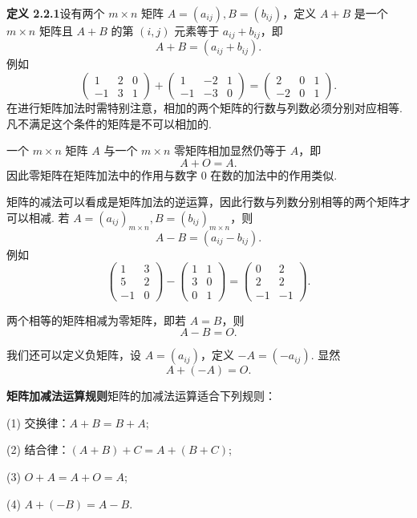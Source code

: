 \documentclass[UTF8,12pt,a4paper,fontset=fandol]{ctexart}
\begin{document}
\noindent\textbf{定义 2.2.1}\quad 设有两个 $m\times n$ 矩阵 $A=(a_{ij}), B=(b_{ij})$，定义 $A+B$ 是一个 $m\times n$ 矩阵且 $A+B$ 的第 $(i,j)$ 元素等于 $a_{ij}+b_{ij}$，即
\[
A+B=(a_{ij}+b_{ij}).
\]
例如
\[
\left(\begin{array}{ccc}
1 & 2 & 0\\
-1 & 3 & 1
\end{array}\right)
+
\left(\begin{array}{ccc}
1 & -2 & 1\\
-1 & -3 & 0
\end{array}\right)
=
\left(\begin{array}{ccc}
2 & 0 & 1\\
-2 & 0 & 1
\end{array}\right).
\]
在进行矩阵加法时需特别注意，相加的两个矩阵的行数与列数必须分别对应相等. 凡不满足这个条件的矩阵是不可以相加的.

一个 $m\times n$ 矩阵 $A$ 与一个 $m\times n$ 零矩阵相加显然仍等于 $A$，即
\[
A+O=A.
\]
因此零矩阵在矩阵加法中的作用与数字 $0$ 在数的加法中的作用类似.

矩阵的减法可以看成是矩阵加法的逆运算，因此行数与列数分别相等的两个矩阵才可以相减. 若 $A=(a_{ij})_{m\times n}, B=(b_{ij})_{m\times n}$，则
\[
A-B=(a_{ij}-b_{ij}).
\]
例如
\[
\left(\begin{array}{cc}
1 & 3\\
5 & 2\\
-1 & 0
\end{array}\right)
-
\left(\begin{array}{cc}
1 & 1\\
3 & 0\\
0 & 1
\end{array}\right)
=
\left(\begin{array}{cc}
0 & 2\\
2 & 2\\
-1 & -1
\end{array}\right).
\]

两个相等的矩阵相减为零矩阵，即若 $A=B$，则
\[
A-B=O.
\]

我们还可以定义负矩阵，设 $A=(a_{ij})$，定义 $-A=(-a_{ij})$. 显然
\[
A+(-A)=O.
\]

\noindent\textbf{矩阵加减法运算规则}\quad 矩阵的加减法运算适合下列规则：

(1) 交换律：$A+B=B+A$;

(2) 结合律：$(A+B)+C=A+(B+C)$;

(3) $O+A=A+O=A$;

(4) $A+(-B)=A-B$.
\end{document}
